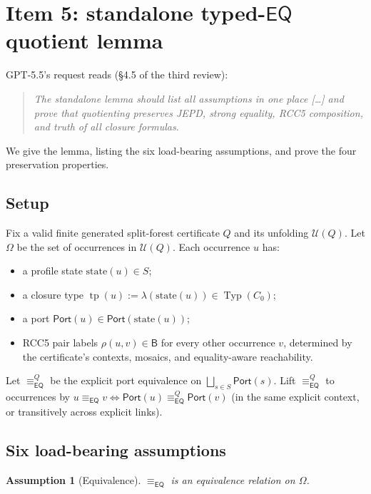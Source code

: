 \documentclass[11pt]{article}
\newtheorem{assumption}[theorem]{Assumption}
\newcommand{\Typ}{\operatorname{Typ}}
\newcommand{\EQ}{\mathsf{EQ}}
\newcommand{\Base}{\mathsf{B}}
\newcommand{\eqrel}{\equiv_{\EQ}}
\newcommand{\eqQ}{\equiv_{\EQ}^{Q}}
\newcommand{\Port}{\mathsf{Port}}
\newcommand{\tp}{\operatorname{tp}}
\begin{document}
\section{Item 5: standalone typed-\(\EQ\) quotient lemma}
\label{sec:quotient}

GPT-5.5's request reads (\S4.5 of the third review):

\begin{quote}\itshape
The standalone lemma should list all assumptions in one place
[\ldots] and prove that quotienting preserves JEPD, strong equality,
RCC5 composition, and truth of all closure formulas.
\end{quote}

We give the lemma, listing the six load-bearing assumptions, and
prove the four preservation properties.

\subsection{Setup}

Fix a valid finite generated split-forest certificate \(Q\) and its
unfolding \(\mathcal U(Q)\).  Let \(\Omega\) be the set of
occurrences in \(\mathcal U(Q)\).  Each occurrence \(u\) has:
\begin{itemize}[leftmargin=2em]
  \item a profile state \(\mathrm{state}(u) \in S\);
  \item a closure type \(\tp(u) := \lambda(\mathrm{state}(u)) \in \Typ(C_0)\);
  \item a port \(\Port(u) \in \Port(\mathrm{state}(u))\);
  \item RCC5 pair labels \(\rho(u, v) \in \Base\) for every other
    occurrence \(v\), determined by the certificate's contexts,
    mosaics, and equality-aware reachability.
\end{itemize}
Let \(\eqQ\) be the explicit port equivalence on
\(\bigsqcup_{s \in S} \Port(s)\).  Lift \(\eqQ\) to occurrences by
\(u \eqrel v \iff \Port(u) \eqQ \Port(v)\) (in the same explicit
context, or transitively across explicit links).

\subsection{Six load-bearing assumptions}

\begin{assumption}[Equivalence]\label{ass:equiv}
\(\eqrel\) is an equivalence relation on \(\Omega\).
\end{assumption}
\end{document}
